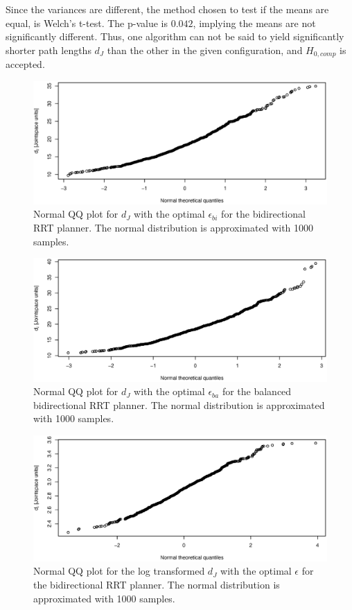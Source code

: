 Since the variances are different, the method chosen to test if the means are equal,
is Welch's t-test.
The p-value is \(0.042\), implying the means are not significantly different.
Thus, one algorithm can not be said to yield significantly shorter path lengths \(d_J\) than the other
in the given configuration, and \(H_{0,comp}\) is accepted.

\begin{figure}[ht]
 \centering
 \includegraphics[width=\figsize]{graphics/qq_op_bi}
 \caption{Normal QQ plot for \(d_J\) with the optimal \(\epsilon_{bi}\) for the bidirectional RRT planner.
 The normal distribution is approximated with 1000 samples.}
 \label{fig:bidir_qq}
\end{figure}

\begin{figure}[H]
 \centering
 \includegraphics[width=\figsize]{graphics/qq_op_ba}
 \caption{Normal QQ plot for \(d_J\) with the optimal \(\epsilon_{ba}\) for the balanced bidirectional RRT planner.
 The normal distribution is approximated with 1000 samples.}
 \label{fig:balanced_qq}
\end{figure}

\begin{figure}[H]
 \centering
 \includegraphics[width=\figsize]{graphics/qq_tran_op_bi}
 \caption{Normal QQ plot for the log transformed \(d_J\) with the optimal \(\epsilon\) for the bidirectional RRT planner. The normal distribution is approximated with 1000 samples.}
 \label{fig:bidir_log_qq}
\end{figure}

